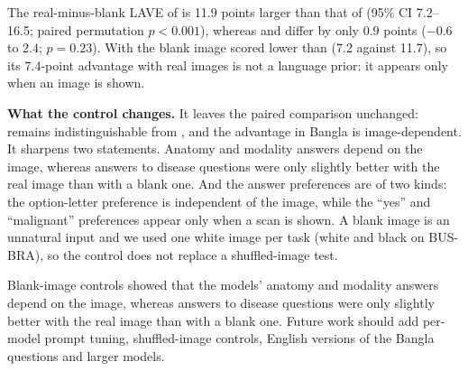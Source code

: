 {The real-minus-blank LAVE of \medgemma{} is 11.9 points larger than that of \gemma{} (95\% CI 7.2--16.5; paired permutation $p<0.001$), whereas \medvlm{} and \qwen{} differ by only 0.9 points ($-0.6$ to $2.4$; $p=0.23$). With the blank image \medgemma{} scored lower than \gemma{} (7.2 against 11.7), so its 7.4-point advantage with real images is not a language prior: it appears only when an image is shown.

\textbf{What the control changes.} It leaves the paired comparison unchanged: \medvlm{} remains indistinguishable from \qwen{}, and the \medgemma{} advantage in Bangla is image-dependent. It sharpens two statements. Anatomy and modality answers depend on the image, whereas answers to disease questions were only slightly better with the real image than with a blank one. And the answer preferences are of two kinds: the option-letter preference is independent of the image, while the ``yes'' and ``malignant'' preferences appear only when a scan is shown. A blank image is an unnatural input and we used one white image per task (white and black on BUS-BRA), so the control does not replace a shuffled-image test.
}


{\color{blue}
Blank-image controls showed that the models' anatomy and modality answers depend on the image, whereas answers to disease questions were only slightly better with the real image than with a blank one. Future work should add per-model prompt tuning, shuffled-image controls, English versions of the Bangla questions and larger models.
}
